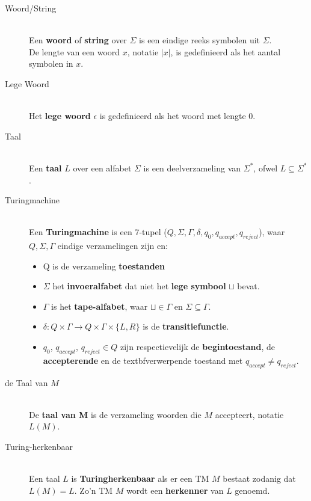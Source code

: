 \documentclass[]{article}
\begin{document}
\begin{itemize}
\begin{description}
	\item[Woord/String] \hfill \\
	Een \textbf{woord} of \textbf{string} over $\Sigma$ is een eindige reeks symbolen uit $\Sigma$.\\
	De lengte van een woord $x$, notatie $\vert x \vert$, is gedefinieerd als het aantal symbolen in $x$.
	
	\item[Lege Woord] \hfill \\
	Het \textbf{lege woord} $\epsilon$ is gedefinieerd als het woord met lengte 0.
	
	\item[Taal] \hfill \\
	Een \textbf{taal} $L$ over een alfabet $\Sigma$ is een deelverzameling van $\Sigma^*$, ofwel $L \subseteq \Sigma^*$.
	
	\item[Turingmachine] \hfill \\
	Een \textbf{Turingmachine} is een 7-tupel ($Q, \Sigma, \Gamma, \delta, q_0, q_{accept}, q_{reject}$), waar $Q, \Sigma, \Gamma$ eindige verzamelingen zijn en:
	\begin{itemize}
		\item Q is de verzameling \textbf{toestanden}
		\item $\Sigma$ het \textbf{invoeralfabet} dat niet het \textbf{lege symbool} $\sqcup$ bevat.
		\item $\Gamma$ is het \textbf{tape-alfabet}, waar $\sqcup \in \Gamma$ en $\Sigma \subseteq \Gamma$.
		\item $\delta : Q \times \Gamma \longrightarrow Q \times \Gamma \times \{ L, R \}$ is de \textbf{transitiefunctie}.
		\item $q_0$, $q_{accept}$, $q_{reject} \in Q$ zijn respectievelijk de \textbf{begintoestand}, de \textbf{accepterende} en de textbf{verwerpende toestand} met $q_{accept} \neq q_{reject}$. 
	\end{itemize}
	
	\item[de Taal van $M$] \hfill \\
	De \textbf{taal van M} is de verzameling woorden die $M$ accepteert, notatie $L(M)$.
	
	\item[Turing-herkenbaar] \hfill \\
	Een taal $L$ is \textbf{Turingherkenbaar} als er een TM $M$ bestaat zodanig dat $L(M) = L$. Zo'n TM $M$ wordt een \textbf{herkenner} van $L$ genoemd.
	

\end{description}
\end{itemize}
\end{document}

